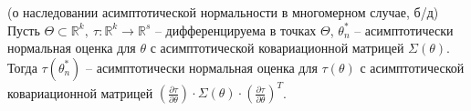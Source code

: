 \begin{proposition}
(о наследовании асимптотической нормальности в многомерном случае, б/д) Пусть $\displaystyle \Theta \subset \mathbb{R}^{k},\ \tau :\mathbb{R}^{k}\rightarrow \mathbb{R}^{s}$ -- дифференцируема в точках $\displaystyle \Theta $, $\displaystyle \theta _{n}^{*}$ -- асимптотически нормальная оценка для $\displaystyle \theta $ с асимптотической ковариационной матрицей $\displaystyle \Sigma ( \theta )$. Тогда $\displaystyle \tau \left( \theta _{n}^{*}\right)$ -- асимптотически нормальная оценка для $\displaystyle \tau ( \theta )$ с асимптотической ковариационной матрицей $\displaystyle \left(\frac{\partial \tau }{\partial \theta }\right) \cdotp \Sigma ( \theta ) \cdotp \left(\frac{\partial \tau }{\partial \theta }\right)^{T}$.
\end{proposition}